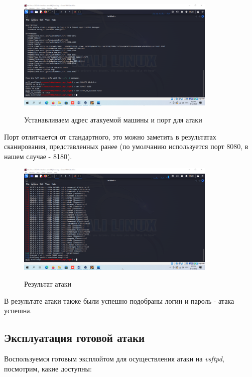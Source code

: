 \documentclass[a4paper]{article}
\begin{document}
  \begin{figure}[H]
    \centering
    \includegraphics[width=0.85\textwidth]{04_0057}
    \label{img:57}
    \caption{Устанавливаем адрес атакуемой машины и порт для атаки}
  \end{figure}

  Порт отлитчается от стандартного, это можно заметить в результатах сканирования,
  представленных ранее (по умолчанию используется порт 8080, в нашем случае - 8180).

  \begin{figure}[H]
    \centering
    \includegraphics[width=0.85\textwidth]{04_0059}
    \label{img:59}
    \caption{Результат атаки}
  \end{figure}

  В результате атаки также были успешно подобраны логин и пароль - атака успешна.

  \subsection{Эксплуатация готовой атаки}

  Воспользуемся готовым эксплойтом для осуществления атаки на \textit{vsftpd}, посмотрим,
  какие доступны:
\end{document}
